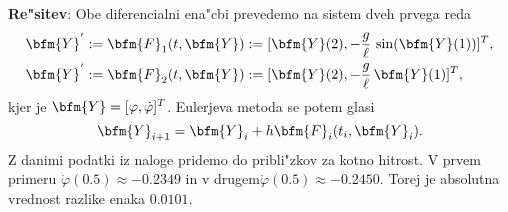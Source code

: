 \begin{enumerate}
    {\bf Re"sitev}: Obe diferencialni ena"cbi prevedemo na sistem dveh 
    prvega reda
    \begin{align*}
    	\bfm{Y}^{'}&:=\bfm{F}_1(t,\bfm{Y}):=[\bfm{Y}(2),-\frac{g}{\ell}\,\sin(\bfm{Y}(1))]^T,\\
	\bfm{Y}^{'}&:=\bfm{F}_2(t,\bfm{Y}):=[\bfm{Y}(2),-\frac{g}{\ell}\,\bfm{Y}(1)]^T, 	
    \end{align*}
    kjer je $\bfm{Y}=[\varphi,\dot\varphi]^T$.
    Eulerjeva metoda se potem glasi
    $$\bfm{Y}_{i+1}=\bfm{Y}_i+h\bfm{F}_i(t_i,\bfm{Y}_i).$$
    Z danimi podatki iz naloge pridemo do pribli"zkov za kotno hitrost.
    V prvem primeru $\dot\varphi(0.5)\approx -0.2349$ in 
    v drugem$\dot\varphi(0.5)\approx -0.2450$.
    Torej je absolutna vrednost razlike enaka $0.0101$.
    
    
\end{enumerate}
